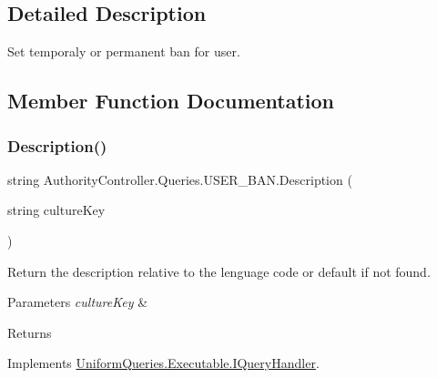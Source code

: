 \subsection{Detailed Description}
Set temporaly or permanent ban for user. 



\subsection{Member Function Documentation}
\mbox{\label{class_authority_controller_1_1_queries_1_1_u_s_e_r___b_a_n_a0635966a71b389cbb4354e61e3c52513}} 
\subsubsection{\texorpdfstring{Description()}{Description()}}
{\footnotesize\ttfamily string Authority\+Controller.\+Queries.\+U\+S\+E\+R\+\_\+\+B\+A\+N.\+Description (\begin{DoxyParamCaption}\item[{string}]{culture\+Key }\end{DoxyParamCaption})}



Return the description relative to the lenguage code or default if not found. 


\begin{DoxyParams}{Parameters}
{\em culture\+Key} & \\
\hline
\end{DoxyParams}
\begin{DoxyReturn}{Returns}

\end{DoxyReturn}


Implements \mbox{\hyperlink{interface_uniform_queries_1_1_executable_1_1_i_query_handler_ae0e55919571d5456af31298394d241a9}{Uniform\+Queries.\+Executable.\+I\+Query\+Handler}}.

\mbox{\label{class_authority_controller_1_1_queries_1_1_u_s_e_r___b_a_n_a719795c950c9dedbc187c2c0cfca37a7}} 
